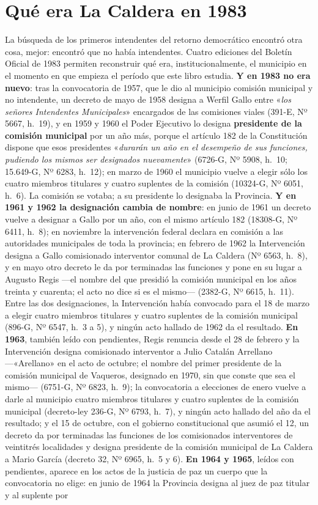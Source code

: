 \section{Qué era La Caldera en 1983}

La búsqueda de los primeros intendentes del retorno democrático encontró otra cosa, mejor: encontró que no había intendentes. Cuatro ediciones del Boletín Oficial de 1983 permiten reconstruir qué era, institucionalmente, el municipio en el momento en que empieza el período que este libro estudia. \textbf{Y en 1983 no era nuevo}: tras la convocatoria de 1957, que le dio al municipio comisión municipal y no intendente, un decreto de mayo de 1958 designa a Werfil Gallo entre «\textit{los señores Intendentes Municipales}» encargados de las comisiones viales (391-E, Nº 5667, h.\ 19), y en 1959 y 1960 el Poder Ejecutivo lo designa \textbf{presidente de la comisión municipal} por un año más, porque el artículo 182 de la Constitución dispone que esos presidentes «\textit{durarán un año en el desempeño de sus funciones, pudiendo los mismos ser designados nuevamente}» (6726-G, Nº 5908, h.\ 10; 15.649-G, Nº 6283, h.\ 12); en marzo de 1960 el municipio vuelve a elegir sólo los cuatro miembros titulares y cuatro suplentes de la comisión (10324-G, Nº 6051, h.\ 6). La comisión se votaba; a su presidente lo designaba la Provincia. \textbf{Y en 1961 y 1962 la designación cambia de nombre}: en junio de 1961 un decreto vuelve a designar a Gallo por un año, con el mismo artículo 182 (18308-G, Nº 6411, h.\ 8); en noviembre la intervención federal declara en comisión a las autoridades municipales de toda la provincia; en febrero de 1962 la Intervención designa a Gallo comisionado interventor comunal de La Caldera (Nº 6563, h.\ 8), y en mayo otro decreto le da por terminadas las funciones y pone en su lugar a Augusto Regis ---el nombre del que presidió la comisión municipal en los años treinta y cuarenta; el acto no dice si es el mismo--- (2382-G, Nº 6615, h.\ 11). Entre las dos designaciones, la Intervención había convocado para el 18 de marzo a elegir cuatro miembros titulares y cuatro suplentes de la comisión municipal (896-G, Nº 6547, h.\ 3 a 5), y ningún acto hallado de 1962 da el resultado. \textbf{En 1963}, también leído con pendientes, Regis renuncia desde el 28 de febrero y la Intervención designa comisionado interventor a Julio Catalán Arrellano ---«Arellano» en el acto de octubre; el nombre del primer presidente de la comisión municipal de Vaqueros, designado en 1970, sin que conste que sea el mismo--- (6751-G, Nº 6823, h.\ 9); la convocatoria a elecciones de enero vuelve a darle al municipio cuatro miembros titulares y cuatro suplentes de la comisión municipal (decreto-ley 236-G, Nº 6793, h.\ 7), y ningún acto hallado del año da el resultado; y el 15 de octubre, con el gobierno constitucional que asumió el 12, un decreto da por terminadas las funciones de los comisionados interventores de veintitrés localidades y designa presidente de la comisión municipal de La Caldera a Mario García (decreto 32, Nº 6965, h.\ 5 y 6). \textbf{En 1964 y 1965}, leídos con pendientes, aparece en los actos de la justicia de paz un cuerpo que la convocatoria no elige: en junio de 1964 la Provincia designa al juez de paz titular y al suplente por 